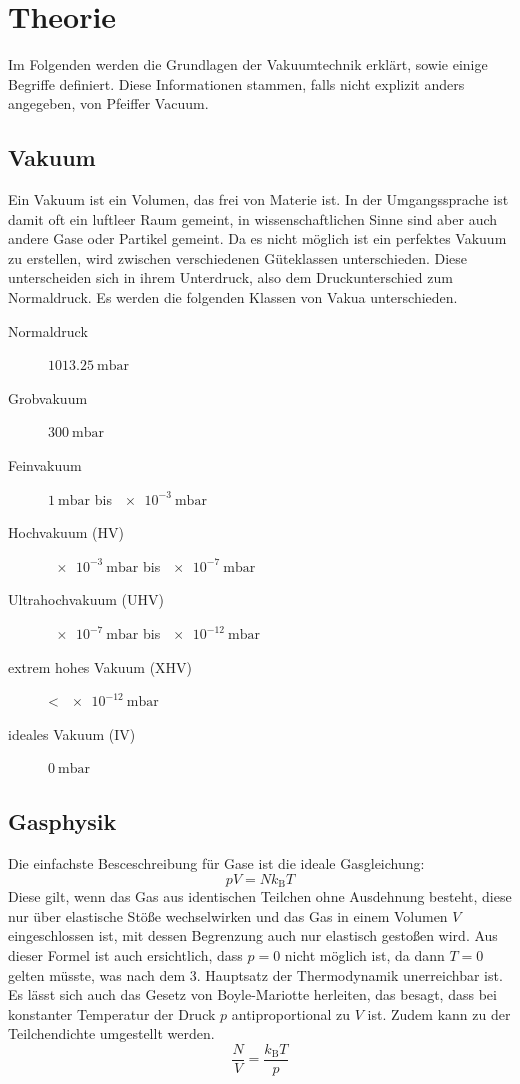 \section{Theorie}
\label{sec:Theorie}
Im Folgenden werden die Grundlagen der Vakuumtechnik erklärt, sowie einige Begriffe definiert. Diese Informationen stammen, falls nicht explizit anders angegeben, von Pfeiffer Vacuum\cite{Pfeiffer}.
\subsection{Vakuum}
Ein Vakuum ist ein Volumen, das frei von Materie ist. In der Umgangssprache ist damit oft ein luftleer Raum gemeint, in wissenschaftlichen Sinne sind aber auch
andere Gase oder Partikel gemeint. Da es nicht möglich ist ein perfektes Vakuum zu erstellen, wird zwischen verschiedenen Güteklassen unterschieden. Diese
unterscheiden sich in ihrem Unterdruck, also dem Druckunterschied zum Normaldruck. Es werden die folgenden Klassen von Vakua unterschieden.
\begin{description}
	\item[Normaldruck] $\SI{1013.25}{\milli \bar}$
	\item[Grobvakuum] $\SI{300}{\milli \bar}$
	\item[Feinvakuum] $\SI{1}{\milli \bar}$ bis $\SI{e-3}{\milli \bar}$
	\item[Hochvakuum (HV)] $\SI{e-3}{\milli \bar}$ bis $\SI{e-7}{\milli \bar}$
	\item[Ultrahochvakuum (UHV)] $\SI{e-7}{\milli \bar}$ bis $\SI{e-12}{\milli \bar}$
	\item[extrem hohes Vakuum (XHV)] < $\SI{e-12}{\milli \bar}$
	\item[ideales Vakuum (IV)] $\SI{0}{\milli \bar}$
\end{description}
\subsection{Gasphysik}
Die einfachste Besceschreibung für Gase ist die ideale Gasgleichung:
\begin{equation}
	pV=Nk_\text{B}T
\end{equation}
Diese gilt, wenn das Gas aus identischen Teilchen ohne Ausdehnung besteht, diese nur über elastische Stöße wechselwirken und das Gas in einem Volumen $V$ eingeschlossen
ist, mit dessen Begrenzung auch nur elastisch gestoßen wird. Aus dieser Formel ist auch ersichtlich, dass $p=0$ nicht möglich ist, da dann $T=0$ gelten
müsste, was nach dem 3. Hauptsatz der Thermodynamik unerreichbar ist. Es lässt sich auch das Gesetz von Boyle-Mariotte herleiten, das besagt, dass bei
 konstanter Temperatur der Druck $p$ antiproportional zu $V$ ist. Zudem kann zu der Teilchendichte umgestellt werden.\cite{TuSKierfeld}
 \begin{equation}
 	\frac{N}{V}=\frac{k_\text{B}T}{p}
 \end{equation}

